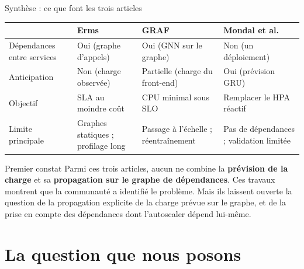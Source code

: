 \documentclass[aspectratio=169,10pt]{beamer}
\begin{document}
\begin{frame}{Synthèse : ce que font les trois articles}
  \footnotesize
  \begin{center}
  \begin{tabular}{@{}>{\raggedright\arraybackslash}p{3cm}>{\raggedright\arraybackslash}p{3.2cm}>{\raggedright\arraybackslash}p{3.2cm}>{\raggedright\arraybackslash}p{3.2cm}@{}}
    \toprule
     & \textbf{Erms} & \textbf{GRAF} & \textbf{Mondal et al.} \\
    \midrule
    Dépendances entre services & Oui (graphe d'appels) & Oui (GNN sur le graphe) & Non (un déploiement) \\[3pt]
    Anticipation & Non (charge observée) & Partielle (charge du front-end) & Oui (prévision GRU) \\[3pt]
    Objectif & SLA au moindre coût & CPU minimal sous SLO & Remplacer le HPA réactif \\[3pt]
    Limite principale & Graphes statiques ; profilage long & Passage à l'échelle ; réentraînement & Pas de dépendances ; validation limitée \\
    \bottomrule
  \end{tabular}
  \end{center}

  \vspace{0.2cm}
  \normalsize
  \begin{alertblock}{Premier constat}
    \small Parmi ces trois articles, aucun ne combine la \textbf{prévision de la charge} et sa \textbf{propagation sur le graphe de dépendances}. Ces travaux montrent que la communauté a identifié le problème. Mais ils laissent ouverte la question de la propagation explicite de la charge prévue sur le graphe, et de la prise en compte des dépendances dont l'autoscaler dépend lui-même.
  \end{alertblock}
\end{frame}

\section{La question que nous posons}
\end{document}
